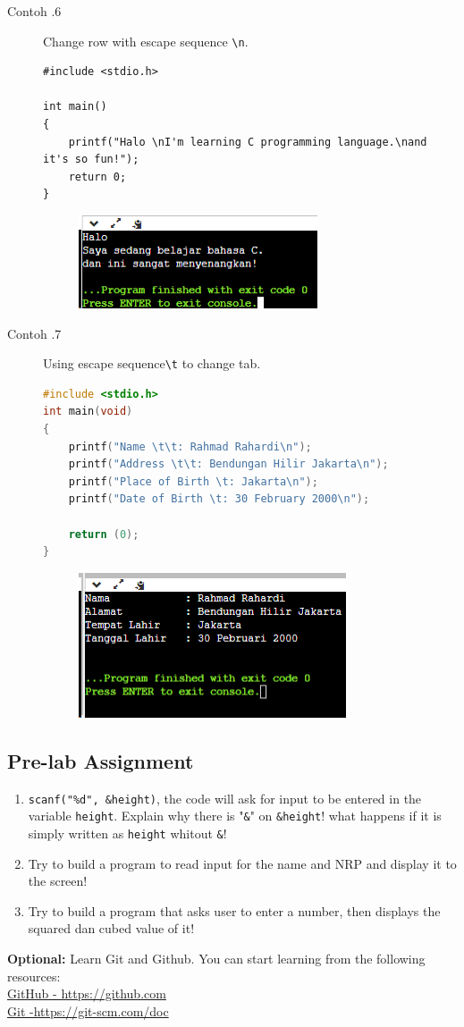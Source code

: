 \begin{description}
	\item[Contoh \thesubsection.6] Change row with escape sequence \verb*|\n|.
		\begin{lstlisting}
#include <stdio.h>

int main() 
{
	printf("Halo \nI'm learning C programming language.\nand it's so fun!");
	return 0;
}
	\end{lstlisting}
		\begin{figure}[H]
			\centering
			\includegraphics[width=0.5\linewidth]{P1/img/screenshot0006.png}
			\caption{}
			\label{fig:screenshot0006}
		\end{figure}

	\item[Contoh \thesubsection.7] Using escape sequence\verb*|\t| to change tab.
		\begin{lstlisting}[language=c]
#include <stdio.h>
int main(void)
{
	printf("Name \t\t: Rahmad Rahardi\n");
	printf("Address \t\t: Bendungan Hilir Jakarta\n");
	printf("Place of Birth \t: Jakarta\n");
	printf("Date of Birth \t: 30 February 2000\n");
	
	return (0);
}
\end{lstlisting}
		\begin{figure}[H]
			\centering
			\includegraphics[width=0.5\linewidth]{P1/img/screenshot0007.png}
			\caption{}
			\label{fig:screenshot0007}
		\end{figure}
\end{description}

\subsection{Pre-lab Assignment}
\begin{enumerate}
	\item \verb|scanf("%d", &height)|, the code will ask for input to be entered in the variable \verb|height|. Explain why there is "\verb|&|" on \verb|&height|! what happens if it is simply written as \verb|height| whitout \verb|&|!
	\item Try to build a program to read input for the name and NRP and display it to the screen!
	\item Try to build a program that asks user to enter a number, then displays the squared dan cubed value of it!
\end{enumerate}

\begin{center}
	\colorbox{cyan!30}{\parbox{0.8\linewidth}{\textbf{Optional:} Learn Git and Github. You can start learning from the following resources: \\ \href{https://github.com}{GitHub - https://github.com} \\ \href{https://git-scm.com/doc}{Git -https://git-scm.com/doc}}}
\end{center}
